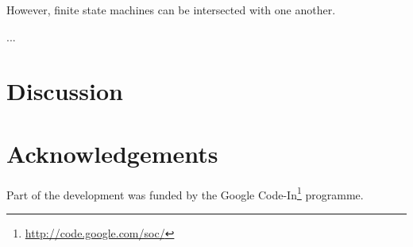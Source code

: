 \documentclass[11pt]{article}
\begin{document}

However, finite state machines can be intersected with one another.

...

\section{Discussion}
\section*{Acknowledgements}
Part of the development was funded by the Google
Code-In\footnote{\href{http://code.google.com/soc/}{http://code.google.com/soc/}
} programme.




\end{document}

